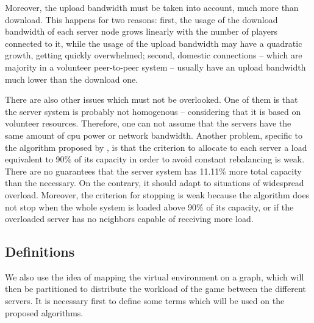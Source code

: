 Moreover, the upload bandwidth must be taken into account, much more than download. This happens for two reasons: first, the usage of the download bandwidth of each server node grows linearly with the number of players connected to it, while the usage of the upload bandwidth may have a quadratic growth, getting quickly overwhelmed; second, domestic connections -- which are majority in a volunteer peer-to-peer system -- usually have an upload bandwidth much lower than the download one.

There are also other issues which must not be overlooked. One of them is that the server system is probably not homogenous -- considering that it is based on volunteer resources. Therefore, one can not assume that the servers have the same amount of cpu power or network bandwidth. Another problem, specific to the algorithm proposed by \cite{lee2003sdl}, is that the criterion to allocate to each server a load equivalent to 90\% of its capacity in order to avoid constant rebalancing is weak. There are no guarantees that the server system has 11.11\% more total capacity than the necessary. On the contrary, it should adapt to situations of widespread overload. Moreover, the criterion for stopping is weak because the algorithm does not stop when the whole system is loaded above 90\% of its capacity, or if the overloaded server has no neighbors capable of receiving more load.

	

\subsection{Definitions}
\label{sec:def}

We also use the idea of mapping the virtual environment on a graph, which will then be partitioned to distribute the workload of the game between the different servers. It is necessary first to define some terms which will be used on the proposed algorithms.


